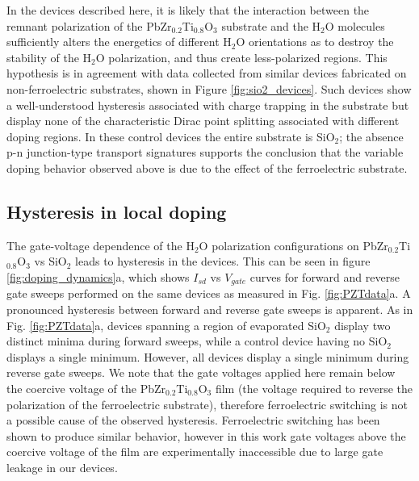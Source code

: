 \documentclass[edeposit,fullpage,draftthesis]{uiucthesis2009}
\begin{document}
        In the devices described here, it is likely that 
        the interaction between the remnant polarization of the PbZr$_{0.2}$Ti$_{0.8}$O$_3$ 
        substrate and the H$_2$O molecules sufficiently alters the energetics of different 
        H$_2$O orientations as to destroy the stability of the H$_2$O polarization, and thus 
        create less-polarized regions. This hypothesis is in agreement with data collected 
        from similar devices fabricated on non-ferroelectric substrates, shown in Figure
        \ref{fig:sio2_devices}. Such devices show 
        a well-understood hysteresis associated with charge trapping in the substrate \cite{wang2010hysteresis}
        but display none of the characteristic Dirac point splitting associated with different
        doping regions. In these control devices the entire substrate is SiO$_2$; the absence
        p-n junction-type transport signatures supports the conclusion that the variable doping
        behavior observed above is due to the effect of the ferroelectric substrate.
        

    \subsection{Hysteresis in local doping}
    
        The gate-voltage dependence of the H$_2$O polarization configurations on 
        PbZr$_{0.2}$Ti$_{0.8}$O$_3$ vs SiO$_2$ leads to hysteresis in the devices. 
        This can be seen in figure \ref{fig:doping_dynamics}a, which shows $I_{sd}$ 
        vs $V_{gate}$ curves for forward and reverse gate sweeps performed on the same 
        devices as measured in Fig. \ref{fig:PZTdata}a. A pronounced hysteresis between 
        forward and reverse gate sweeps is apparent. As in Fig. \ref{fig:PZTdata}a, 
        devices spanning a region of evaporated SiO$_2$ display two distinct minima 
        during forward sweeps, while a control device having no SiO$_2$ displays a 
        single minimum. However, all devices display a single minimum during reverse 
        gate sweeps. We note that the gate voltages applied here remain below the coercive 
        voltage of the PbZr$_{0.2}$Ti$_{0.8}$O$_3$ film (the voltage required to reverse
        the polarization of the ferroelectric substrate), therefore ferroelectric switching 
        is not a possible cause of the observed hysteresis. Ferroelectric switching has 
        been shown to produce similar behavior\cite{Park2015b}, however in this work gate
        voltages above the coercive voltage of the film are experimentally inaccessible 
        due to large gate leakage in our devices.
\end{document}
